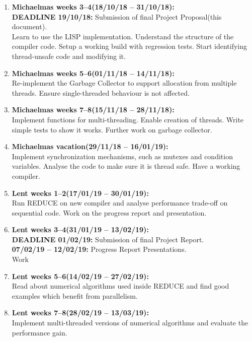 \documentclass[12pt,a4paper,twoside]{article}
\begin{document}
\begin{enumerate}

\item \textbf{Michaelmas weeks 3--4(18/10/18 -- 31/10/18):} \\ 
\textbf{DEADLINE 19/10/18:} Submission of final Project Proposal(this document). \\
Learn to use the LISP implementation. Understand the structure of the compiler code.
Setup a working build with regression tests. Start identifying thread-unsafe code and
modifying it.

\item \textbf{Michaelmas weeks 5--6(01/11/18 -- 14/11/18):} \\
Re-implement the Garbage Collector to support allocation from multiple threads.
Ensure single-threaded behaviour is not affected.

\item \textbf{Michaelmas weeks 7--8(15/11/18 -- 28/11/18):} \\
Implement functions for multi-threading. Enable creation of threads. Write simple
tests to show it works. Further work on garbage collector.

\item \textbf{Michaelmas vacation(29/11/18 -- 16/01/19):} \\
Implement synchronization mechanisms, such as mutexes and condition variables. Analyse the code to make sure it is thread safe. Have a working compiler.

\item \textbf{Lent weeks 1--2(17/01/19 -- 30/01/19):} \\
Run REDUCE on new compiler and analyse performance trade-off on sequential code.
Work on the progress report and presentation.

\item \textbf{Lent weeks 3--4(31/01/19 -- 13/02/19):} \\
\textbf{DEADLINE 01/02/19:} Submission of final Project Report. \\
\textbf{07/02/19 -- 12/02/19:} Progress Report Presentations. \\
Work 

\item \textbf{Lent weeks 5--6(14/02/19 -- 27/02/19):} \\
Read about numerical algorithms used inside REDUCE and find
good examples which benefit from parallelism.

\item \textbf{Lent weeks 7--8(28/02/19 -- 13/03/19):} \\
Implement multi-threaded versions of numerical algorithms and
evaluate the performance gain.


\end{enumerate}
\end{document}

